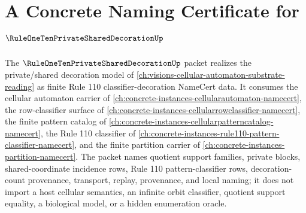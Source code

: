 \chapter{A Concrete Naming Certificate for $\RuleOneTenPrivateSharedDecorationUp$}
\label{ch:concrete-instances-rule-one-ten-private-shared-decoration-namecert}

The $\RuleOneTenPrivateSharedDecorationUp$ packet realizes the private/shared decoration model of \autoref{ch:visions-cellular-automaton-substrate-reading} as finite Rule 110 classifier-decoration NameCert data. It consumes the cellular automaton carrier of \autoref{ch:concrete-instances-cellularautomaton-namecert}, the row-classifier surface of \autoref{ch:concrete-instances-cellularrowclassifier-namecert}, the finite pattern catalog of \autoref{ch:concrete-instances-cellularpatterncatalog-namecert}, the Rule 110 classifier of \autoref{ch:concrete-instances-rule110-pattern-classifier-namecert}, and the finite partition carrier of \autoref{ch:concrete-instances-partition-namecert}. The packet names quotient support families, private blocks, shared-coordinate incidence rows, Rule 110 pattern-classifier rows, decoration-count provenance, transport, replay, provenance, and local naming; it does not import a host cellular semantics, an infinite orbit classifier, quotient support equality, a biological model, or a hidden enumeration oracle.

